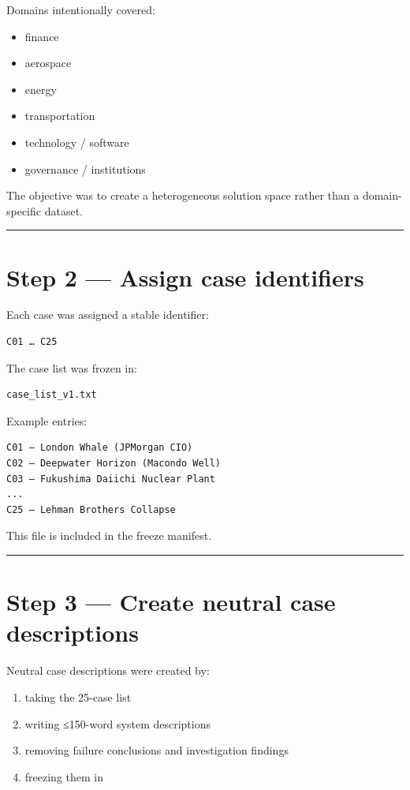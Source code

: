 {Domains intentionally covered:

\begin{itemize}
\item finance
\item aerospace
\item energy
\item transportation
\item technology / software
\item governance / institutions
\end{itemize}

The objective was to create a heterogeneous solution space rather than a domain-specific dataset.

\noindent\rule{\textwidth}{0.4pt}

\section*{Step 2 — Assign case identifiers}

Each case was assigned a stable identifier:

\begin{verbatim}
C01 … C25
\end{verbatim}

The case list was frozen in:

\begin{verbatim}
case_list_v1.txt
\end{verbatim}

Example entries:

\begin{verbatim}
C01 — London Whale (JPMorgan CIO)
C02 — Deepwater Horizon (Macondo Well)
C03 — Fukushima Daiichi Nuclear Plant
...
C25 — Lehman Brothers Collapse
\end{verbatim}

This file is included in the freeze manifest.

\noindent\rule{\textwidth}{0.4pt}

\section*{Step 3 — Create neutral case descriptions}

Neutral case descriptions were created by:

\begin{enumerate}
\item taking the 25-case list
\item writing ≤150-word system descriptions
\item removing failure conclusions and investigation findings
\item freezing them in
\end{enumerate}

}
